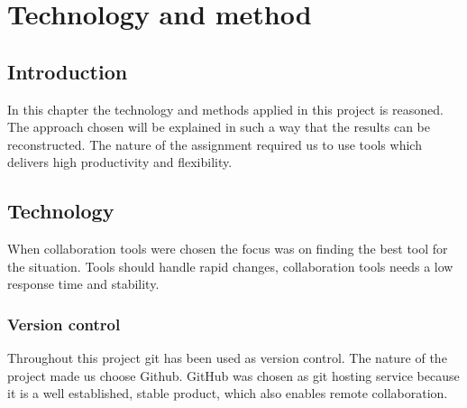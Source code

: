 \chapter{Technology and method}

\section{Introduction}
In this chapter the technology and methods applied in this project is reasoned. The approach chosen will be explained in such a way that the results can be reconstructed. The nature of the assignment required us to use tools which delivers high productivity and flexibility. 

\section{Technology} %
When collaboration tools were chosen the focus was on finding the best tool for the situation. Tools should handle rapid changes, collaboration tools needs a low response time and stability. %

\subsection{Version control}
Throughout this project git has been used as version control. The nature of the project made us choose Github. GitHub was chosen as git hosting service because it is a well established, stable product, which also enables remote collaboration.


